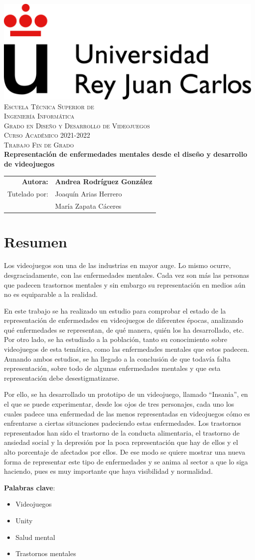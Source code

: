 \documentclass[12pt, a4paper,twoside,titlepage]{book}
\newcommand{\grado}{Grado en Diseño y Desarrollo de Videojuegos}
\newcommand{\titulotrabajo}{Representación de enfermedades mentales desde el diseño y desarrollo de videojuegos}
\newcommand{\curso}{Curso Académico 2021-2022}
\newcommand{\autor}{Andrea Rodríguez González}
\newcommand{\tutor}{Joaquín Arias Herrero}
\newcommand{\cotutor}{María Zapata Cáceres}
\renewcommand*{\maketitle}{%
\begin{titlepage}
  \pagestyle{plain}

  \begin{center}
    \vspace*{-4em}
    \includegraphics[scale=.9]{URJ_logo_Color_POS}\\
    \vspace*{4em}
    \textsc{\Large Escuela Técnica Superior de\\Ingeniería Informática}\\
    \vspace*{2em}
    \textsc{\Large \grado}\\  %
    \vspace*{3em}
     \textsc{\large \curso\\}  %
    \vspace*{1.5em}
    \textsc{\large Trabajo Fin de Grado\\}
    \vspace*{13em}
    \textbf{\LARGE \titulotrabajo\\}  %
    \vspace*{5em}
    {%
      \large
      \begin{tabular}{rl}
        \textbf{Autora:} & \textbf{\autor}\\[.5em]
        {Tutelado por:} & {\tutor}\\[-.25em]
                          & {\cotutor}\\
      \end{tabular}
    }
  \end{center}
  
\end{titlepage}
}
\let\origdoublepage\cleardoublepage
\renewcommand{\cleardoublepage}{\clearpage{\pagestyle{empty}\origdoublepage}}
\begin{document}
\maketitle



\cleardoublepage
{}
\setcounter{page}{1}

\chapter*{Resumen}

Los videojuegos son una de las industrias en mayor auge. Lo mismo ocurre, desgraciadamente, con las enfermedades mentales. Cada vez son más las personas que padecen trastornos mentales y sin embargo su representación en medios aún no es equiparable a la realidad. 

En este trabajo se ha realizado un estudio para comprobar el estado de la representación de enfermedades en videojuegos de diferentes épocas, analizando qué enfermedades se representan, de qué manera, quién los ha desarrollado, etc. Por otro lado, se ha estudiado a la población, tanto su conocimiento sobre videojuegos de esta temática, como las enfermedades mentales que estos padecen. Aunando ambos estudios, se ha llegado a la conclusión de que todavía falta representación, sobre todo de algunas enfermedades mentales y que esta representación debe desestigmatizarse. 

Por ello, se ha desarrollado un prototipo de un videojuego, llamado ``Insania'', en el que se puede experimentar, desde los ojos de tres personajes, cada uno los cuales padece una enfermedad de las menos representadas en videojuegos cómo es enfrentarse a ciertas situaciones padeciendo estas enfermedades. Los trastornos representados han sido el trastorno de la conducta alimentaria, el trastorno de ansiedad social y la depresión por la poca representación que hay de ellos y el alto porcentaje de afectados por ellos. De ese modo se quiere mostrar una nueva forma de representar este tipo de enfermedades y se anima al sector a que lo siga haciendo, pues es muy importante que haya visibilidad y normalidad. 


\noindent \textbf{Palabras clave}:
\begin{itemize}
   \item Videojuegos
   \item Unity
   \item Salud mental
   \item Trastornos mentales
\end{itemize}
\end{document}
